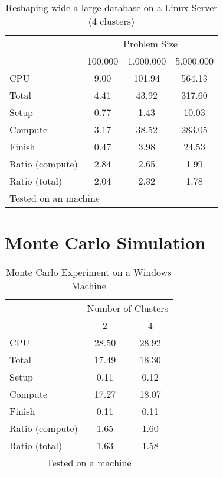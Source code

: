 \documentclass[letterpaper, 14pt, titlepage]{article}
\begin{document}
\begin{landscape}
\begin{table}[!h]
\Large
\centering
\caption{\large Reshaping wide a large database on a Linux Server (4 clusters)}
\begin{tabular}{l*{3}{c}}\hline
& \multicolumn{3}{c}{Problem Size} \\
& 100.000 &          1.000.000 &         5.000.000 \\ \hline
CPU &     9.00 &    101.94 &    564.13 \\
Total &     4.41 &     43.92 &    317.60 \\
\hspace{2mm} Setup &     0.77 &      1.43 &     10.03 \\
\hspace{2mm} Compute &     3.17 &     38.52 &    283.05 \\
\hspace{2mm} Finish &     0.47 &      3.98 &     24.53 \\
\hline Ratio (compute) &     2.84 &      2.65 &      1.99 \\
Ratio (total) &     2.04 &      2.32 &      1.78 \\
\hline
\multicolumn{4}{l}{\footnotesize Tested on an \unix1 machine}
\end{tabular}
\end{table}

\pagebreak

\section{\Huge Monte Carlo Simulation}

\begin{table}[!h]
\Large
\centering
\caption{\large Monte Carlo Experiment on a Windows Machine}
\begin{tabular}{l*{2}{c}}\hline
& \multicolumn{2}{c}{Number of Clusters} \\
& 2 &               4 \\ \hline
CPU &    28.50 &     28.92 \\
Total &    17.49 &     18.30 \\
\hspace{2mm} Setup &     0.11 &      0.12 \\
\hspace{2mm} Compute &    17.27 &     18.07 \\
\hspace{2mm} Finish &     0.11 &      0.11 \\
\hline Ratio (compute) &     1.65 &      1.60 \\
Ratio (total) &     1.63 &      1.58 \\
\hline
\multicolumn{3}{c}{\footnotesize Tested on a \win1 machine}
\end{tabular}
\end{table}


\end{landscape}
\end{document}
